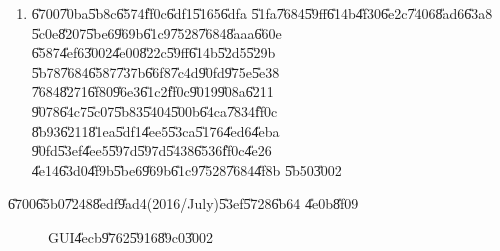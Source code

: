 \begin{enumerate}
\item \U{6700}\U{70ba}\U{5b8c}\U{6574}\U{ff0c}\U{6df1}\U{5165}\U{6dfa}%
\U{51fa}\U{7684}\U{59ff}\U{614b}\U{4f30}\U{6e2c}\U{7406}\U{8ad6}\U{63a8}%
\U{5c0e}\U{8207}\U{5be6}\U{969b}\U{61c9}\U{7528}\U{7684}\U{8aaa}\U{660e}%
\U{6587}\U{4ef6}\U{3002}\U{4e00}\U{822c}\U{59ff}\U{614b}\U{52d5}\U{529b}%
\U{5b78}\U{7684}\U{6587}\U{737b}\U{66f8}\U{7c4d}\U{90fd}\U{975e}\U{5e38}%
\U{7684}\U{8271}\U{6f80}\U{96e3}\U{61c2}\U{ff0c}\U{9019}\U{908a}\U{6211}%
\U{9078}\U{64c7}\U{5c07}\U{5b83}\U{5404}\U{500b}\U{64ca}\U{7834}\U{ff0c}%
\U{8b93}\U{6211}\U{81ea}\U{5df1}\U{4ee5}\U{53ca}\U{5176}\U{4ed6}\U{4eba}%
\U{90fd}\U{53ef}\U{4ee5}\U{597d}\U{597d}\U{5438}\U{6536}\U{ff0c}\U{4e26}%
\U{4e14}\U{63d0}\U{4f9b}\U{5be6}\U{969b}\U{61c9}\U{7528}\U{7684}\U{4f8b}%
\U{5b50}\U{3002}
\end{enumerate}

\bigskip

\U{6700}\U{65b0}\U{7248}\U{8edf}\U{9ad4}(2016/July)\U{53ef}\U{5728}\U{6b64}%
\U{4e0b}\U{8f09}

\href{https://github.com/whymranderson/cordtrans}{\underline{\color{blue}%
}}

\begin{figure}[th]
\caption{GUI\U{4ecb}\U{9762}\U{5916}\U{89c0}\U{3002}}
\label{gui_appear}
\begin{center}
\end{center}
\end{figure}

